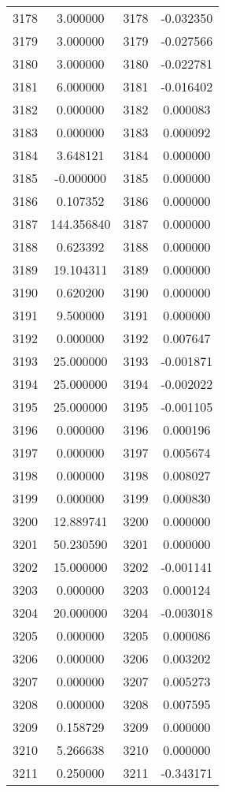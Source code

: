 \documentclass[12pt]{article}
\begin{document}
\begin{longtable}{@{}cccc@{}}
3178 & 3.000000 & 3178 & -0.032350 \\
3179 & 3.000000 & 3179 & -0.027566 \\
3180 & 3.000000 & 3180 & -0.022781 \\
3181 & 6.000000 & 3181 & -0.016402 \\
3182 & 0.000000 & 3182 & 0.000083 \\
3183 & 0.000000 & 3183 & 0.000092 \\
3184 & 3.648121 & 3184 & 0.000000 \\
3185 & -0.000000 & 3185 & 0.000000 \\
3186 & 0.107352 & 3186 & 0.000000 \\
3187 & 144.356840 & 3187 & 0.000000 \\
3188 & 0.623392 & 3188 & 0.000000 \\
3189 & 19.104311 & 3189 & 0.000000 \\
3190 & 0.620200 & 3190 & 0.000000 \\
3191 & 9.500000 & 3191 & 0.000000 \\
3192 & 0.000000 & 3192 & 0.007647 \\
3193 & 25.000000 & 3193 & -0.001871 \\
3194 & 25.000000 & 3194 & -0.002022 \\
3195 & 25.000000 & 3195 & -0.001105 \\
3196 & 0.000000 & 3196 & 0.000196 \\
3197 & 0.000000 & 3197 & 0.005674 \\
3198 & 0.000000 & 3198 & 0.008027 \\
3199 & 0.000000 & 3199 & 0.000830 \\
3200 & 12.889741 & 3200 & 0.000000 \\
3201 & 50.230590 & 3201 & 0.000000 \\
3202 & 15.000000 & 3202 & -0.001141 \\
3203 & 0.000000 & 3203 & 0.000124 \\
3204 & 20.000000 & 3204 & -0.003018 \\
3205 & 0.000000 & 3205 & 0.000086 \\
3206 & 0.000000 & 3206 & 0.003202 \\
3207 & 0.000000 & 3207 & 0.005273 \\
3208 & 0.000000 & 3208 & 0.007595 \\
3209 & 0.158729 & 3209 & 0.000000 \\
3210 & 5.266638 & 3210 & 0.000000 \\
3211 & 0.250000 & 3211 & -0.343171 \\

\end{longtable}
\end{document}
